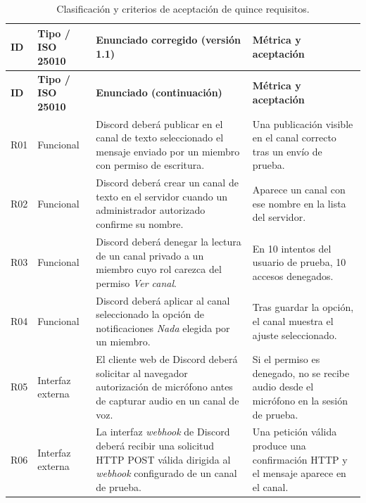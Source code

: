 \documentclass[12pt,a4paper]{article}
\begin{document}
\begin{longtable}{
    |p{0.8cm}
    |p{2.05cm}
    |p{6.65cm}
    |p{4.15cm}|
}

\caption{
Clasificación y criterios de aceptación de quince requisitos.
}
\label{tab:requisitos}\\

\hline

\textbf{ID} &
\textbf{Tipo / ISO 25010} &
\textbf{Enunciado corregido (versión 1.1)} &
\textbf{Métrica y aceptación}\\

\hline
\endfirsthead

\hline
\textbf{ID} &
\textbf{Tipo / ISO 25010} &
\textbf{Enunciado (continuación)} &
\textbf{Métrica y aceptación}\\
\hline
\endhead

R01 &
Funcional &
Discord deberá publicar en el canal de texto seleccionado el mensaje enviado por un miembro con permiso de escritura. &
Una publicación visible en el canal correcto tras un envío de prueba.\\
\hline

R02 &
Funcional &
Discord deberá crear un canal de texto en el servidor cuando un administrador autorizado confirme su nombre. &
Aparece un canal con ese nombre en la lista del servidor.\\
\hline

R03 &
Funcional &
Discord deberá denegar la lectura de un canal privado a un miembro cuyo rol carezca del permiso \emph{Ver canal}. &
En 10 intentos del usuario de prueba, 10 accesos denegados.\\
\hline

R04 &
Funcional &
Discord deberá aplicar al canal seleccionado la opción de notificaciones \emph{Nada} elegida por un miembro. &
Tras guardar la opción, el canal muestra el ajuste seleccionado.\\
\hline

R05 &
Interfaz externa &
El cliente web de Discord deberá solicitar al navegador autorización de micrófono antes de capturar audio en un canal de voz. &
Si el permiso es denegado, no se recibe audio desde el micrófono en la sesión de prueba.\\
\hline

R06 &
Interfaz externa &
La interfaz \emph{webhook} de Discord deberá recibir una solicitud HTTP POST válida dirigida al \emph{webhook} configurado de un canal de prueba. &
Una petición válida produce una confirmación HTTP y el mensaje aparece en el canal.\\
\hline


\end{longtable}
\end{document}
